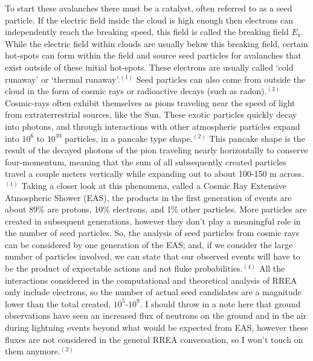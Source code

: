 \documentclass[11pt]{article}
\begin{document}
    To start these avalanches there must be a catalyst, often referred to as a seed particle. If the electric field inside the cloud is high enough then electrons can independently reach the breaking speed, this field is called the breaking field $E_b$. While the electric field within clouds are usually below this breaking field, certain hot-spots can form within the field and source seed particles for avalanches that exist outside of these initial hot-spots. These electrons are usually called `cold runaway' or `thermal runaway'.$^{(1)}$ Seed particles can also come from outside the cloud in the form of cosmic rays or radioactive decays (such as radon).$^{(3)}$ Cosmic-rays often exhibit themselves as pions traveling near the speed of light from extraterrestrial sources, like the Sun. These exotic particles quickly decay into photons, and through interactions with other atmospheric particles expand into $10^6$ to $10^{10}$ particles, in a pancake type shape.$^{(2)}$ This pancake shape is the result of the decayed photons of the pion traveling nearly horizontally to conserve four-momentum, meaning that the sum of all subsequently created particles travel a couple meters vertically while expanding out to about 100-150 m across.$^{(1)}$ Taking a closer look at this phenomena, called a Cosmic Ray Extensive Atmospheric Shower (EAS), the products in the first generation of events are about 89\% are protons, 10\% electrons, and 1\% other particles. More particles are created in subsequent generations, however they don’t play a meaningful role in the number of seed particles. So, the analysis of seed particles from cosmic rays can be considered by one generation of the EAS; and, if we consider the large number of particles involved, we can state that our observed events will have to be the product of expectable actions and not fluke probabilities.$^{(4)}$ All the interactions considered in the computational and theoretical analysis of RREA only include electrons, so the number of actual seed candidates are a magnitude lower than the total created, $10^5$-$10^9$. I should throw in a note here that ground observations have seen an increased flux of neutrons on the ground and in the air during lightning events beyond what would be expected from EAS, however these fluxes are not considered in the general RREA conversation, so I won't touch on them anymore.$^{(2)}$
    
\end{document}
